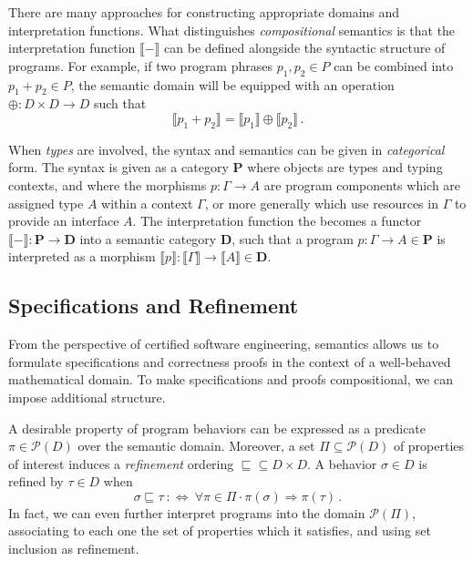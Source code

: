 \documentclass[sigplan,10pt,review,anonymous]{acmart}
\newcommand{\bdot}{\cdot}
\begin{document}
There are many approaches
for constructing appropriate domains
and interpretation functions.
What distinguishes \emph{compositional} semantics
is that the interpretation function $\llbracket - \rrbracket$
can be defined alongside the syntactic structure of programs.
For example,
if two program phrases $p_1, p_2 \in P$
can be combined into $p_1 + p_2 \in P$,
the semantic domain will be equipped with an operation
$\oplus : D \times D \rightarrow D$
such that
\[
  \llbracket p_1 + p_2 \rrbracket =
  \llbracket p_1 \rrbracket \oplus
  \llbracket p_2 \rrbracket
  \,.
\]

When \emph{types} are involved,
the syntax and semantics
can be given in \emph{categorical} form.
The syntax is given as a category $\mathbf{P}$
where objects are types and typing contexts,
and where the morphisms $p : \Gamma \rightarrow A$
are program components which
are assigned type $A$ within a context $\Gamma$,
or more generally
which use resources in $\Gamma$ to provide an interface $A$.
The interpretation function
the becomes a functor
$\llbracket - \rrbracket : \mathbf{P} \rightarrow \mathbf{D}$
into a semantic category $\mathbf{D}$,
such that a program $p : \Gamma \rightarrow A \in \mathbf{P}$
is interpreted as
a morphism
$\llbracket p \rrbracket :
 \llbracket \Gamma \rrbracket \rightarrow
 \llbracket A \rrbracket
 \in \mathbf{D}$.


\subsection{Specifications and Refinement} \label{sec:specs} %

From the perspective of certified software engineering,
semantics allows us to formulate specifications and
correctness proofs
in the context of a well-behaved mathematical domain.
To make specifications and proofs compositional,
we can impose additional structure.

A desirable property of program behaviors
can be expressed as a predicate $\pi \in \mathcal{P}(D)$
over the semantic domain.
Moreover,
a set $\Pi \subseteq \mathcal{P}(D)$
of properties of interest
induces a \emph{refinement} ordering
${\sqsubseteq} \subseteq D \times D$.
A behavior $\sigma \in D$ is refined by $\tau \in D$
when %
\[
  \sigma \sqsubseteq \tau \: :\Leftrightarrow \:
  \forall \pi \in \Pi \bdot
  \pi(\sigma) \Rightarrow \pi(\tau)
  \,.
\]
In fact, we can even further interpret programs
into the domain $\mathcal{P}(\Pi)$,
associating to each one the set of properties
which it satisfies,
and using set inclusion as refinement.
\end{document}
